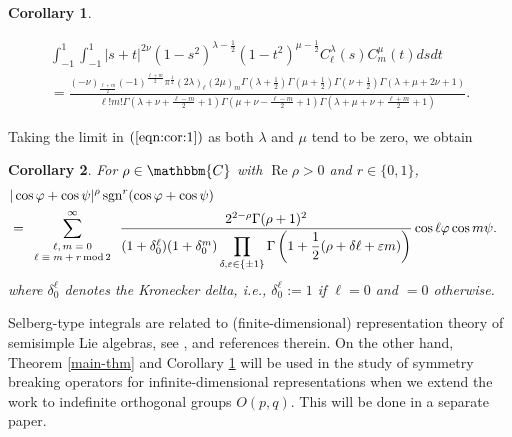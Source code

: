 \documentclass[12pt]{article}
\numberwithin{equation}{section}
\newcommand{\assign}{:=}
\newcommand{\tmdummy}{$\mbox{}$}
\newcommand{\tmop}[1]{\ensuremath{\operatorname{#1}}}
\newcommand{\tmscript}[1]{\text{\scriptsize{$#1$}}}
\newtheorem{corollary}{Corollary}[section]
{\theorembodyfont{\rmfamily}\newtheorem{example}[corollary]{Example}}
\begin{document}
\begin{corollary}
  \label{cor:1}{\tmdummy}
  
  \begin{eqnarray}
    & \displaystyle\int_{- 1}^1 \displaystyle\int_{- 1}^1 | s + t |^{2 \nu} (1 - s^2)^{\lambda -
    \frac{1}{2}} (1 - t^2)^{\mu - \frac{1}{2}} C_{\ell}^{\lambda} (s)
    C_m^{\mu} (t) d s d t &  \nonumber\\
    &\displaystyle = \frac{(- \nu)_{\frac{\ell + m}{2}} (- 1)^{\frac{\ell + m}{2}}
    \pi^{\frac{1}{2}} (2 \lambda)_{\ell} (2 \mu)_m \Gamma \left( \lambda +
    \frac{1}{2} \right) \Gamma \left( \mu + \frac{1}{2} \right) \Gamma \left(
    \nu + \frac{1}{2} \right) \Gamma (\lambda + \mu + 2 \nu + 1)}{\ell !m!
    \Gamma \left( \lambda + \nu + \frac{\ell - m}{2} + 1 \right) \Gamma \left(
    \mu + \nu - \frac{\ell - m}{2} + 1 \right) \Gamma \left( \lambda + \mu +
    \nu + \frac{\ell + m}{2} + 1 \right)}  \label{eqn:cor:1} . & 
  \end{eqnarray}
\end{corollary}

Taking the limit in $(\ref{eqn:cor:1})$ as both $\lambda$ and
$\mu$ tend to be
zero, we obtain

\begin{corollary}
  \label{cor:170599}For $\rho \in \mathbbm{C}$ with $\tmop{Re} \rho > 0$ and
  $r \in \{ 0, 1 \}$,
  \begin{eqnarray}
    & | \cos \varphi + \cos \psi |^{\rho} \tmop{sgn}^r (\cos \varphi + \cos
    \psi) &  \nonumber\\
    & = \displaystyle\sum_{\tmscript{\begin{array}{c}
      \ell, m = 0\\
      \ell \equiv m + r \tmop{mod} 2
    \end{array}}}^{\infty} \frac{2^{2 - \rho} \Gamma (\rho + 1)^2}{(1 +
    \delta_0^{\ell}) (1 + \delta_0^m) \displaystyle\prod_{\delta, \varepsilon \in \{ \pm 1
    \}} \Gamma \left( 1 + \frac{1}{2} (\rho + \delta \ell + \varepsilon m)
    \right)} \cos \ell \varphi \cos m \psi . &  \nonumber
  \end{eqnarray}
  where
  $\delta_0^\ell$ denotes the Kronecker delta, i.e.,
  $\delta_0^{\ell} \assign 1$ if $\ell = 0$ and $= 0$ otherwise.
\end{corollary}

Selberg-type integrals are related to (finite-dimensional) representation
theory of semisimple Lie algebras, see {\cite{forrester2008importance}},
{\cite{tarasov2003selberg}} and references therein. On the other hand, Theorem
\ref{main-thm} and Corollary \ref{cor:1} will be used in the study of symmetry
breaking operators for infinite-dimensional representations when we extend the
work {\cite{kobayashi2015symmetry}} to indefinite orthogonal groups $O (p,
q)$. This will be done in a separate paper.
\end{document}
